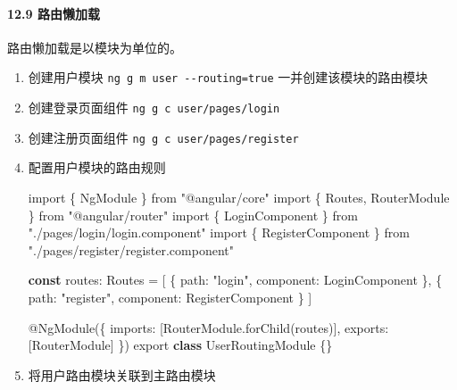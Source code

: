 \documentclass[
]{article}
\newenvironment{Shaded}{}{}
\newcommand{\DataTypeTok}[1]{\textcolor[rgb]{0.56,0.13,0.00}{#1}}
\newcommand{\FunctionTok}[1]{\textcolor[rgb]{0.02,0.16,0.49}{#1}}
\newcommand{\ImportTok}[1]{#1}
\newcommand{\KeywordTok}[1]{\textcolor[rgb]{0.00,0.44,0.13}{\textbf{#1}}}
\newcommand{\NormalTok}[1]{#1}
\newcommand{\OperatorTok}[1]{\textcolor[rgb]{0.40,0.40,0.40}{#1}}
\newcommand{\StringTok}[1]{\textcolor[rgb]{0.25,0.44,0.63}{#1}}
\begin{document}
\hypertarget{129-ux8defux7531ux61d2ux52a0ux8f7d}{%
\paragraph{12.9 路由懒加载}\label{129-ux8defux7531ux61d2ux52a0ux8f7d}}

路由懒加载是以模块为单位的。

\begin{enumerate}
\def\labelenumi{\arabic{enumi}.}
\item
  创建用户模块 \texttt{ng\ g\ m\ user\ -\/-routing=true}
  一并创建该模块的路由模块
\item
  创建登录页面组件 \texttt{ng\ g\ c\ user/pages/login}
\item
  创建注册页面组件 \texttt{ng\ g\ c\ user/pages/register}
\item
  配置用户模块的路由规则

\begin{Shaded}
\begin{Highlighting}[]
\ImportTok{import}\NormalTok{ \{ NgModule \} }\ImportTok{from} \StringTok{"@angular/core"}
\ImportTok{import}\NormalTok{ \{ Routes}\OperatorTok{,}\NormalTok{ RouterModule \} }\ImportTok{from} \StringTok{"@angular/router"}
\ImportTok{import}\NormalTok{ \{ LoginComponent \} }\ImportTok{from} \StringTok{"./pages/login/login.component"}
\ImportTok{import}\NormalTok{ \{ RegisterComponent \} }\ImportTok{from} \StringTok{"./pages/register/register.component"}

\KeywordTok{const}\NormalTok{ routes}\OperatorTok{:}\NormalTok{ Routes }\OperatorTok{=}\NormalTok{ [}
\NormalTok{  \{}
    \DataTypeTok{path}\OperatorTok{:} \StringTok{"login"}\OperatorTok{,}
    \DataTypeTok{component}\OperatorTok{:}\NormalTok{ LoginComponent}
\NormalTok{  \}}\OperatorTok{,}
\NormalTok{  \{}
    \DataTypeTok{path}\OperatorTok{:} \StringTok{"register"}\OperatorTok{,}
    \DataTypeTok{component}\OperatorTok{:}\NormalTok{ RegisterComponent}
\NormalTok{  \}}
\NormalTok{]}

\NormalTok{@}\FunctionTok{NgModule}\NormalTok{(\{}
  \DataTypeTok{imports}\OperatorTok{:}\NormalTok{ [RouterModule}\OperatorTok{.}\FunctionTok{forChild}\NormalTok{(routes)]}\OperatorTok{,}
  \DataTypeTok{exports}\OperatorTok{:}\NormalTok{ [RouterModule]}
\NormalTok{\})}
\ImportTok{export} \KeywordTok{class}\NormalTok{ UserRoutingModule \{\}}
\end{Highlighting}
\end{Shaded}
\item
  将用户路由模块关联到主路由模块


\end{enumerate}
\end{document}
